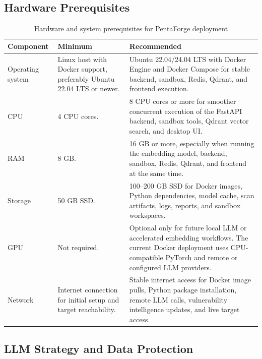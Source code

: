 \documentclass[12pt,a4paper]{report}
\begin{document}
\subsection{Hardware Prerequisites}

\begin{table}[H]
    \centering
    \caption{Hardware and system prerequisites for PentaForge deployment}
    \label{tab:hardware_prerequisites}
    \renewcommand{\arraystretch}{1.35}
    \begin{tabular}{|p{}|p{}|p{}|}
        \hline
        \textbf{Component} & \textbf{Minimum} & \textbf{Recommended} \\
        \hline
        Operating system & Linux host with Docker support, preferably Ubuntu 22.04
        LTS or newer. & Ubuntu 22.04/24.04 LTS with Docker Engine and Docker Compose
        for stable backend, sandbox, Redis, Qdrant, and frontend execution. \\
        \hline
        CPU & 4 CPU cores. & 8 CPU cores or more for smoother concurrent execution
        of the FastAPI backend, sandbox tools, Qdrant vector search, and desktop UI. \\
        \hline
        RAM & 8 GB. & 16 GB or more, especially when running the embedding model,
        backend, sandbox, Redis, Qdrant, and frontend at the same time. \\
        \hline
        Storage & 50 GB SSD. & 100--200 GB SSD for Docker images, Python
        dependencies, model cache, scan artifacts, logs, reports, and sandbox
        workspaces. \\
        \hline
        GPU & Not required. & Optional only for future local LLM or accelerated
        embedding workflows. The current Docker deployment uses CPU-compatible
        PyTorch and remote or configured LLM providers. \\
        \hline
        Network & Internet connection for initial setup and target reachability. &
        Stable internet access for Docker image pulls, Python package installation,
        remote LLM calls, vulnerability intelligence updates, and live target access. \\
        \hline
    \end{tabular}
\end{table}

\subsection{LLM Strategy and Data Protection}
\end{document}

